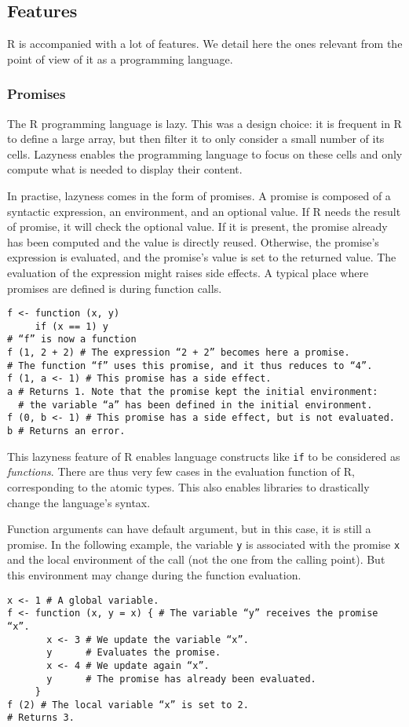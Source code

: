 \documentclass{article}
\newcommand\R{R}
\begin{document}
\subsection{Features}
\label{sec:features}

\R{} is accompanied with a lot of features.
We detail here the ones relevant from the point of view
of it as a programming language.

\subsubsection{Promises}
\label{sec:promises}

The \R{} programming language is lazy.
This was a design choice:
it is frequent in \R{} to define a large array,
but then filter it to only consider a small number of its cells.
Lazyness enables the programming language to focus on these cells
and only compute what is needed to display their content.

In practise, lazyness comes in the form of promises.
A promise is composed of a syntactic expression,
an environment, and an optional value.
If \R{} needs the result of promise,
it will check the optional value.
If it is present, the promise already has been computed
and the value is directly reused.
Otherwise, the promise's expression is evaluated,
and the promise's value is set to the returned value.
The evaluation of the expression might raises side effects.
%
A typical place where promises are defined
is during function calls.
\begin{verbatim}
f <- function (x, y)
     if (x == 1) y
# “f” is now a function
f (1, 2 + 2) # The expression “2 + 2” becomes here a promise.
# The function “f” uses this promise, and it thus reduces to “4”.
f (1, a <- 1) # This promise has a side effect.
a # Returns 1. Note that the promise kept the initial environment:
  # the variable “a” has been defined in the initial environment.
f (0, b <- 1) # This promise has a side effect, but is not evaluated.
b # Returns an error.
\end{verbatim}

This lazyness feature of \R{} enables
language constructs like \texttt{if}
to be considered as \emph{functions}.
There are thus very few cases in the evaluation function
of \R{}, corresponding to the atomic types.
This also enables libraries to drastically change
the language's syntax.

Function arguments can have default argument,
but in this case, it is still a promise.
In the following example,
the variable \texttt{y} is associated with
the promise \texttt{x} and the local environment
of the call (not the one from the calling point).
But this environment may change during the function evaluation.
\begin{verbatim}
x <- 1 # A global variable.
f <- function (x, y = x) { # The variable “y” receives the promise “x”.
       x <- 3 # We update the variable “x”.
       y      # Evaluates the promise.
       x <- 4 # We update again “x”.
       y      # The promise has already been evaluated.
     }
f (2) # The local variable “x” is set to 2.
# Returns 3.
\end{verbatim}
\end{document}
